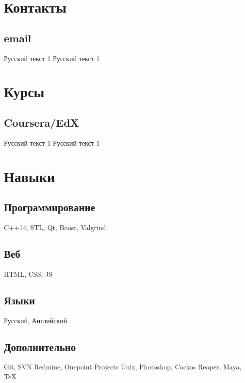 \documentclass[11pt, a4paper]{article}
\begin{document}



\begin{minipage}[t]{0.33\textwidth} %

\section{Контакты} 

\subsection{email}
Русский текст 1
Русский текст 1

\section{Курсы}

\subsection{Coursera/EdX}
Русский текст 1
Русский текст 1

\section{Навыки}

\subsection{Программирование}
C++14, STL, Qt, Boost, Valgrind

\subsection{Веб}
HTML, CSS, JS

\subsection{Языки}

Русский, Английский

\subsection{Дополнительно}
Git, SVN
Redmine, Onepoint Projects
Unix, Photoshop, Cockos Reaper, Maya, TeX

\end{minipage} %
\end{document}
